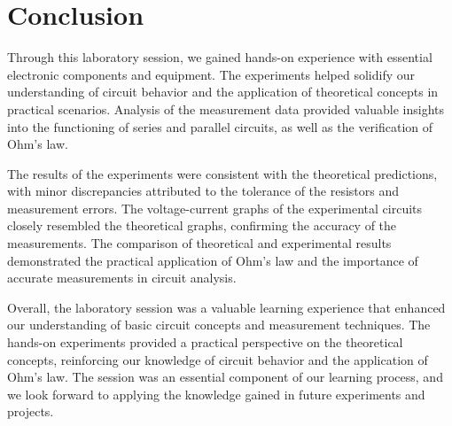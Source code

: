 \chapter{Conclusion}

Through this laboratory session, we gained hands-on experience with essential electronic components and equipment. The experiments helped solidify our understanding of circuit behavior and the application of theoretical concepts in practical scenarios. Analysis of the measurement data provided valuable insights into the functioning of series and parallel circuits, as well as the verification of Ohm’s law.

The results of the experiments were consistent with the theoretical predictions, with minor discrepancies attributed to the tolerance of the resistors and measurement errors. The voltage-current graphs of the experimental circuits closely resembled the theoretical graphs, confirming the accuracy of the measurements. The comparison of theoretical and experimental results demonstrated the practical application of Ohm’s law and the importance of accurate measurements in circuit analysis.

Overall, the laboratory session was a valuable learning experience that enhanced our understanding of basic circuit concepts and measurement techniques. The hands-on experiments provided a practical perspective on the theoretical concepts, reinforcing our knowledge of circuit behavior and the application of Ohm’s law. The session was an essential component of our learning process, and we look forward to applying the knowledge gained in future experiments and projects.

